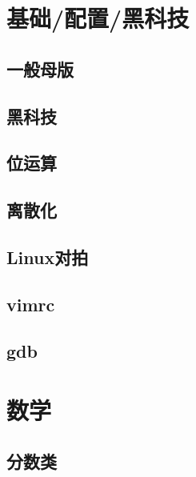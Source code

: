 \documentclass[10pt]{article}
\begin{document}
\tableofcontents
\newpage
\section{基础/配置/黑科技}
\subsection{一般母版}


\subsection{黑科技}


\subsection{位运算}


\subsection{离散化}


\subsection{Linux对拍}


\subsection{vimrc}


\subsection{gdb}

\section{数学}
\subsection{分数类}

\end{document}
